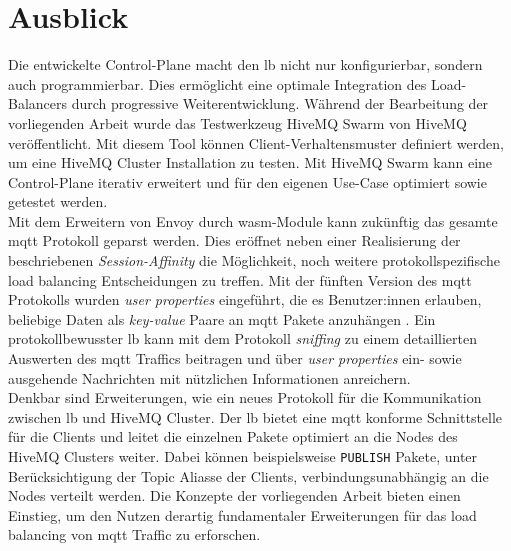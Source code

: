 \section{Ausblick}
Die entwickelte Control-Plane macht den \acl{lb} nicht nur konfigurierbar, sondern auch programmierbar.
Dies ermöglicht eine optimale Integration des Load-Balancers durch progressive Weiterentwicklung.
Während der Bearbeitung der vorliegenden Arbeit wurde das Testwerkzeug HiveMQ Swarm \cite{teamHiveMQSwarmFind} von HiveMQ veröffentlicht. Mit diesem Tool können Client-Verhaltensmuster definiert werden, um eine HiveMQ Cluster Installation zu testen.
Mit HiveMQ Swarm kann eine Control-Plane iterativ erweitert und für den eigenen Use-Case optimiert sowie getestet werden.
\\
Mit dem Erweitern von Envoy durch \acl{wasm}-Module kann zukünftig das gesamte \ac{mqtt} Protokoll geparst werden.
Dies eröffnet neben einer Realisierung der beschriebenen \textit{Session-Affinity} die Möglichkeit, noch weitere protokollspezifische load balancing Entscheidungen zu treffen.
Mit der fünften Version des \ac{mqtt} Protokolls wurden \textit{user properties} eingeführt, die es Benutzer:innen erlauben, beliebige Daten als \textit{key-value} Paare an \ac{mqtt} Pakete anzuhängen \cite{raschbichlerMQTTHowNewa}.
Ein protokollbewusster \acl{lb} kann mit dem Protokoll \textit{sniffing} zu einem detaillierten Auswerten des \ac{mqtt} Traffics beitragen und über \textit{user properties} ein- sowie ausgehende Nachrichten mit nützlichen Informationen anreichern.
\\
Denkbar sind Erweiterungen, wie ein neues Protokoll für die Kommunikation zwischen \acl{lb} und HiveMQ Cluster.
Der \acl{lb} bietet eine \ac{mqtt} konforme Schnittstelle für die Clients und leitet die einzelnen Pakete optimiert an die Nodes des HiveMQ Clusters weiter.
Dabei können beispielsweise \verb|PUBLISH| Pakete, unter Berücksichtigung der Topic Aliasse der Clients, verbindungsunabhängig an die Nodes verteilt werden.
Die Konzepte der vorliegenden Arbeit bieten einen Einstieg, um den Nutzen derartig fundamentaler Erweiterungen für das load balancing von \ac{mqtt} Traffic zu erforschen.
